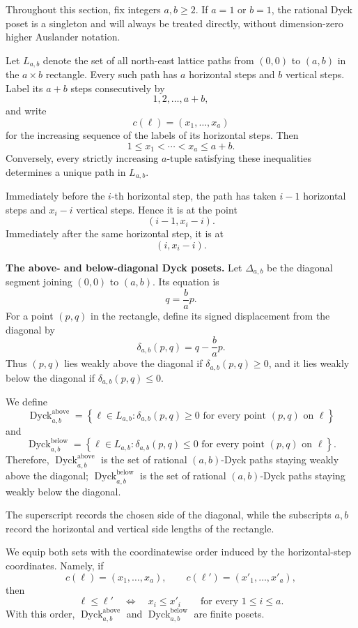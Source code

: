 \documentclass[12pt,a4paper,english,reqno]{amsart}
\theoremstyle{plain}
\theoremstyle{definition}
\newcommand{\Dyck}{\operatorname{Dyck}}
\begin{document}
Throughout this section, fix integers $a,b\geq2$. If $a=1$ or $b=1$,
the rational Dyck poset is a singleton and will always be treated
directly, without dimension-zero higher Auslander notation.

Let $L_{a,b}$ denote the set of all north-east lattice paths from
$(0,0)$ to $(a,b)$ in the $a\times b$ rectangle. Every such path has
$a$ horizontal steps and $b$ vertical steps. Label its $a+b$ steps
consecutively by
\[
1,2,\ldots,a+b,
\]
and write
\[
c(\ell)=(x_1,\ldots,x_a)
\]
for the increasing sequence of the labels of its horizontal steps.
Then
\[
1\leq x_1<\cdots<x_a\leq a+b.
\]
Conversely, every strictly increasing $a$-tuple satisfying these
inequalities determines a unique path in $L_{a,b}$.

Immediately before the $i$-th horizontal step, the path has taken
$i-1$ horizontal steps and $x_i-i$ vertical steps. Hence it is at the
point
\[
(i-1,x_i-i).
\]
Immediately after the same horizontal step, it is at
\[
(i,x_i-i).
\]

\medskip
\noindent\textbf{The above- and below-diagonal Dyck posets.}
Let $\Delta_{a,b}$ be the diagonal segment joining $(0,0)$ to $(a,b)$.
Its equation is
\[
q=\frac ba p.
\]
For a point $(p,q)$ in the rectangle, define its signed displacement
from the diagonal by
\[
\delta_{a,b}(p,q)
=
q-\frac ba p.
\]
Thus $(p,q)$ lies weakly above the diagonal if
$\delta_{a,b}(p,q)\geq0$, and it lies weakly below the diagonal if
$\delta_{a,b}(p,q)\leq0$.

We define
\[
\Dyck^{\mathrm{above}}_{a,b}
=
\left\{
\ell\in L_{a,b}:
\delta_{a,b}(p,q)\geq0
\text{ for every point }(p,q)\text{ on }\ell
\right\}
\]
and
\[
\Dyck^{\mathrm{below}}_{a,b}
=
\left\{
\ell\in L_{a,b}:
\delta_{a,b}(p,q)\leq0
\text{ for every point }(p,q)\text{ on }\ell
\right\}.
\]
Therefore, $\Dyck^{\mathrm{above}}_{a,b}$ is the set of rational
$(a,b)$-Dyck paths staying weakly above the diagonal; $\Dyck^{\mathrm{below}}_{a,b}$ is the set of rational
$(a,b)$-Dyck paths staying weakly below the diagonal.


The superscript records the chosen side of the diagonal, while the
subscripts $a,b$ record the horizontal and vertical side lengths of
the rectangle.

We equip both sets with the coordinatewise order induced by the
horizontal-step coordinates. Namely, if
\[
c(\ell)=(x_1,\ldots,x_a),
\qquad
c(\ell')=(x'_1,\ldots,x'_a),
\]
then
\[
\ell\leq\ell'
\quad\Longleftrightarrow\quad
x_i\leq x'_i
\qquad
\text{for every }1\leq i\leq a.
\]
With this order,
$\Dyck^{\mathrm{above}}_{a,b}$ and
$\Dyck^{\mathrm{below}}_{a,b}$ are finite posets.
\end{document}
